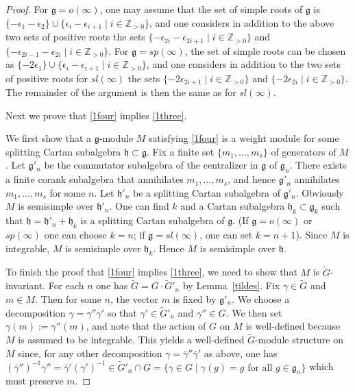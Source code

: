 \documentclass{amsart}
\renewcommand{\sl}{sl}
\newcommand{\so}{o}
\renewcommand{\sp}{sp}
\renewcommand{\gg}{\mathfrak{g}}
\newcommand{\hh}{\mathfrak{h}}
\newcommand{\ZZ}{\mathbb{Z}}
\theoremstyle{definition}
\numberwithin{equation}{section}
\begin{document}
\begin{proof}
For $\gg = \so(\infty)$, one may assume that the set of simple roots of $\gg$ is $\{ -\epsilon_1 - \epsilon_2 \} \cup \{ \epsilon_i - \epsilon_{i+1} \mid  i \in \ZZ_{>0} \}$, and one considers in addition to the above two
sets of positive roots the sets $\{ -\epsilon_{2i} - \epsilon_{2i+1}
\mid i \in \ZZ_{>0} \}$ and $\{ -\epsilon_{2i-1} - \epsilon_{2i} \mid i
\in \ZZ_{>0} \}$.  For $\gg = \sp(\infty)$, the set of simple roots can be chosen as $\{ -2\epsilon_1 \} \cup \{ \epsilon_i - \epsilon_{i+1} \mid  i \in \ZZ_{>0} \}$, and one considers in addition to the two sets of positive roots for $\sl(\infty)$ the sets  $\{ -2\epsilon_{2i
  +1} \mid i \in \ZZ_{>0} \}$ and $\{ -2\epsilon_{2i} \mid i \in
\ZZ_{>0} \}$.  The remainder of the argument is then the same as for $\sl(\infty)$.

Next we prove that \eqref{1four} implies \eqref{1three}.  

We first show that a $\gg$-module $M$ satisfying \eqref{1four} is a weight
module for some splitting Cartan subalgebra $\hh \subset \gg$.  Fix a
finite set $\{ m_1, \ldots, m_s \}$ of generators of $M$. Let $\gg'_n$ be the commutator subalgebra of the centralizer in $\gg$ of $\gg_n$.  There exists a finite corank subalgebra that annihilates $m_1, \ldots, m_s$, and hence $\gg'_n$ annihilates $m_1, \ldots, m_s$ for some $n$. Let $\hh'_n$
be a splitting Cartan subalgebra of $\gg'_n$. Obviously $M$ is
semisimple over $\hh'_n$. One can find $k$ and a Cartan
subalgebra $\hh_k\subset\gg_k$ such that $\hh=\hh'_n+\hh_k$ is a
splitting Cartan subalgebra of $\gg$. (If $\gg=\so(\infty)$ or
$\sp(\infty)$ one can choose $k=n$; if $\gg=\sl(\infty)$, one can set $k=n+1$). Since $M$ is integrable, $M$ is semisimple over $\hh_k$. Hence $M$ is semisimple over $\hh$. 

To finish the proof that \eqref{1four} implies \eqref{1three}, we need to show that $M$ is $\tilde{G}$-invariant.  For each $n$ one has 
$\tilde{G} = G \cdot \tilde{G}'_n$ by Lemma~\ref{tildes}. 
Fix $\gamma \in \tilde{G}$ and $m \in M$.  Then for some $n$, the vector $m$ is fixed by $\gg'_n$.   We choose a decomposition $\gamma = \gamma'' \gamma'$ so that $\gamma' \in \tilde{G}'_n$ and $\gamma'' \in G$.  We then 
set $\gamma (m) := \gamma'' (m)$, and note that the action of $G$ on $M$ is well-defined because $M$ is assumed to be integrable.  This yields a well-defined $\tilde{G}$-module structure on $M$ since, for any other decomposition $\gamma = \bar{\gamma}'' \bar{\gamma}'$ as above, one has $(\bar{\gamma}'')^{-1}\gamma'' = \bar{\gamma}' (\gamma')^{-1} \in \tilde{G}'_n \cap G = \{ \gamma \in G \mid \gamma (g) = g \textrm{ for all } g \in \gg_n \}$ which must preserve $m$.


\end{proof}
\end{document}
